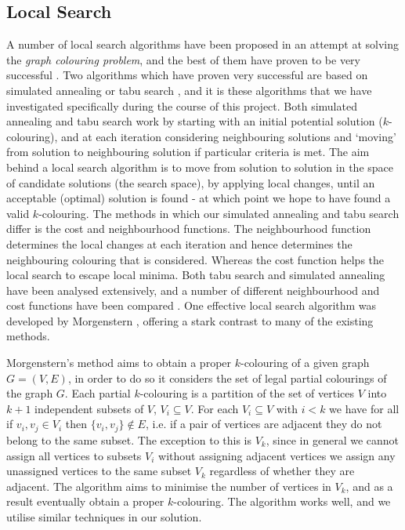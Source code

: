 \documentclass[12pt,a4paper]{article}
\begin{document}
\subsection*{Local Search}
A number of local search algorithms have been proposed in an attempt at solving the \textit{graph colouring problem}, and the best of them have proven to be very successful \cite{Stutzle}. Two algorithms which have proven very successful are based on simulated annealing or tabu search \cite{Lewis}, and it is these algorithms that we have investigated specifically during the course of this project. Both simulated annealing and tabu search work by starting with an initial potential solution ($k$-colouring), and at each iteration considering neighbouring solutions and `moving' from solution to neighbouring solution if particular criteria is met. The aim behind a local search algorithm is to move from solution to solution in the space of candidate solutions (the search space), by applying local changes, until an acceptable (optimal) solution is found - at which point we hope to have found a valid $k$-colouring. The methods in which our simulated annealing and tabu search differ is the cost and neighbourhood functions. The neighbourhood function determines the local changes at each iteration and hence determines the neighbouring colouring that is considered. Whereas the cost function helps the local search to escape local minima. Both tabu search and simulated annealing have been analysed extensively, and a number of different neighbourhood and cost functions have been compared \cite{Stutzle}. One effective local search algorithm was developed by Morgenstern \cite{Johnson}, offering a stark contrast to many of the existing methods. 
\par Morgenstern's method aims to obtain a proper $k$-colouring of a given graph $G=(V,E)$, in order to do so it considers the set of legal partial colourings of the graph $G$. Each partial $k$-colouring is a partition of the set of vertices $V$ into $k+1$ independent subsets of $V$, $V_i \subseteq V$. For each $V_i \subseteq V$ with $i < k$ we have for all if $v_i, v_j \in V_i$ then $\{v_i, v_j\} \notin E$, i.e. if a pair of vertices are adjacent they do not belong to the same subset. The exception to this is $V_k$, since in general we cannot assign all vertices to subsets $V_i$ without assigning adjacent vertices we assign any unassigned vertices to the same subset $V_k$ regardless of whether they are adjacent. The algorithm aims to minimise the number of vertices in $V_k$, and as a result eventually obtain a proper $k$-colouring. The algorithm works well, and we utilise similar techniques in our solution.
\end{document}
